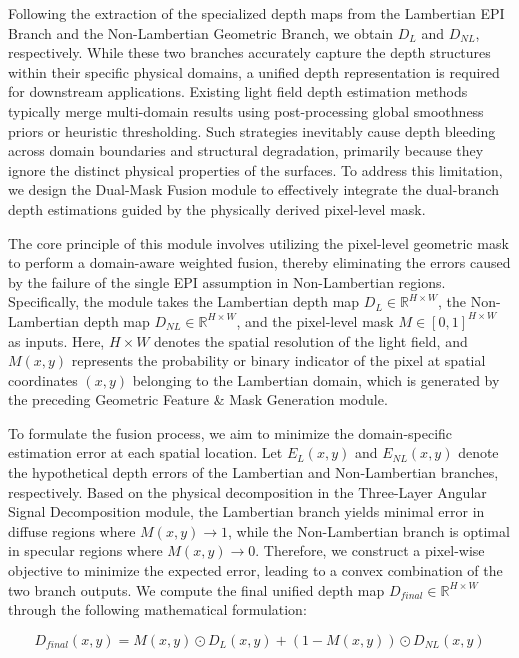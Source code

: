 Following the extraction of the specialized depth maps from the Lambertian EPI Branch and the Non-Lambertian Geometric Branch, we obtain $D_L$ and $D_{NL}$, respectively. While these two branches accurately capture the depth structures within their specific physical domains, a unified depth representation is required for downstream applications. Existing light field depth estimation methods typically merge multi-domain results using post-processing global smoothness priors or heuristic thresholding. Such strategies inevitably cause depth bleeding across domain boundaries and structural degradation, primarily because they ignore the distinct physical properties of the surfaces. To address this limitation, we design the Dual-Mask Fusion module to effectively integrate the dual-branch depth estimations guided by the physically derived pixel-level mask.

The core principle of this module involves utilizing the pixel-level geometric mask to perform a domain-aware weighted fusion, thereby eliminating the errors caused by the failure of the single EPI assumption in Non-Lambertian regions. Specifically, the module takes the Lambertian depth map $D_L \in \mathbb{R}^{H \times W}$, the Non-Lambertian depth map $D_{NL} \in \mathbb{R}^{H \times W}$, and the pixel-level mask $M \in [0, 1]^{H \times W}$ as inputs. Here, $H \times W$ denotes the spatial resolution of the light field, and $M(x,y)$ represents the probability or binary indicator of the pixel at spatial coordinates $(x,y)$ belonging to the Lambertian domain, which is generated by the preceding Geometric Feature \& Mask Generation module.

To formulate the fusion process, we aim to minimize the domain-specific estimation error at each spatial location. Let $E_L(x,y)$ and $E_{NL}(x,y)$ denote the hypothetical depth errors of the Lambertian and Non-Lambertian branches, respectively. Based on the physical decomposition in the Three-Layer Angular Signal Decomposition module, the Lambertian branch yields minimal error in diffuse regions where $M(x,y) \to 1$, while the Non-Lambertian branch is optimal in specular regions where $M(x,y) \to 0$. Therefore, we construct a pixel-wise objective to minimize the expected error, leading to a convex combination of the two branch outputs. We compute the final unified depth map $D_{final} \in \mathbb{R}^{H \times W}$ through the following mathematical formulation:

\begin{equation}
\label{eq:eq15}
D_{final}(x,y) = M(x,y) \odot D_L(x,y) + (1 - M(x,y)) \odot D_{NL}(x,y)
\end{equation}

